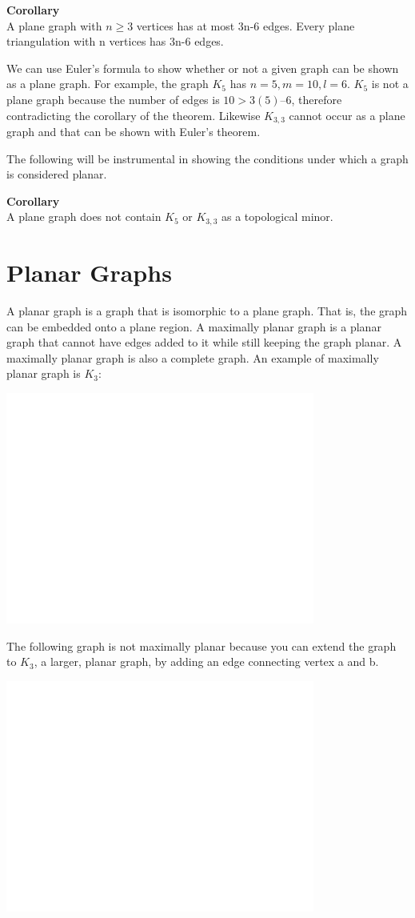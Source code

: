 \textbf{Corollary}\\
A plane graph with $n \geq 3$ vertices has at most 3n-6 edges. Every plane triangulation with n vertices has 3n-6 edges. 

We can use Euler's formula to show whether or not a given graph can be shown as a plane graph. For example, the graph $K_5$ has $n=5, m=10, l=6$. $K_5$ is not a plane graph because the number of edges is $10 > 3(5) – 6$, therefore contradicting the corollary of the theorem. Likewise $K_{3,3}$ cannot occur as a plane graph and that can be shown with Euler's theorem.

The following will be instrumental in showing the conditions under which a graph is considered planar.

\textbf{Corollary}\\
A plane graph does not contain $K_5$ or $K_{3,3}$  as a topological minor.

\section{Planar Graphs}
A planar graph is a graph that is isomorphic to a plane graph. That is, the graph can be embedded onto a plane region. A maximally planar graph is a planar graph that cannot have edges added to it while still keeping the graph planar.  A maximally planar graph is also a complete graph. An example of maximally planar graph is $K_3$:


\includegraphics[height = 3in]{white.png}

The following graph is not maximally planar because you can extend the graph to $K_3$, a larger, planar graph, by adding an edge connecting vertex a and b.	


\includegraphics[height = 3in]{white.png}

